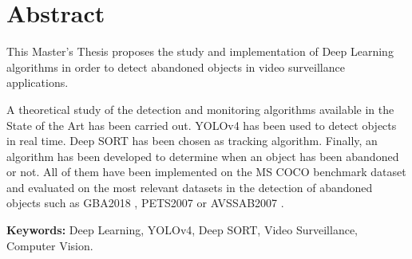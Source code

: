 
\chapter*{Abstract}
\label{cha:abstract}

\noindent
This Master's Thesis proposes the study and implementation of Deep Learning algorithms in order to detect abandoned objects in video surveillance applications.

A theoretical study of the detection and monitoring algorithms available in the State of the Art has been carried out. YOLOv4 \cite{bochkovskiy2020yolov4} has been used to detect objects in real time. Deep SORT \cite{Wojke2017simple} has been chosen as tracking algorithm. Finally, an algorithm has been developed to determine when an object has been abandoned or not. All of them have been implemented on the MS COCO \cite{lin2015microsoft} benchmark dataset and evaluated on the most relevant datasets in the detection of abandoned objects such as GBA2018 \cite{gba-dataset}, PETS2007 \cite{pets2007-dataset} or AVSSAB2007 \cite{AVSSAB2007-dataset}.

\textbf{Keywords:} Deep Learning, YOLOv4, Deep SORT, Video Surveillance, Computer Vision.